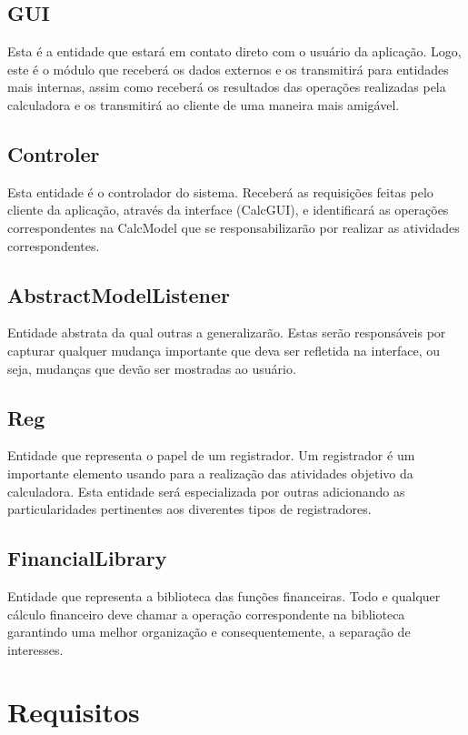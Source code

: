 \subsection{GUI}
Esta é a entidade que estará em contato direto com o usuário da aplicação. Logo, este é o módulo que receberá os dados externos e os transmitirá para entidades mais internas, assim como receberá os resultados das operações realizadas pela calculadora e os transmitirá ao cliente de uma maneira mais amigável.
\subsection{Controler}
Esta entidade é o controlador do sistema. Receberá as requisições feitas pelo cliente da aplicação, através da interface (CalcGUI), e identificará as operações correspondentes na CalcModel que se responsabilizarão por realizar as atividades correspondentes.
\subsection{AbstractModelListener}
Entidade abstrata da qual outras a generalizarão. Estas serão responsáveis por capturar qualquer mudança importante que deva ser refletida na interface, ou seja, mudanças que devão ser mostradas ao usuário.
\subsection{Reg}
Entidade que representa o papel de um registrador. Um registrador é um importante elemento usando para a realização das atividades objetivo da calculadora. Esta entidade será especializada por outras adicionando as particularidades pertinentes aos diverentes tipos de registradores.
\subsection{FinancialLibrary}
Entidade que representa a biblioteca das funções financeiras. Todo e qualquer cálculo financeiro deve chamar a operação correspondente na biblioteca garantindo uma melhor organização e consequentemente, a separação de interesses.


\section{Requisitos}


